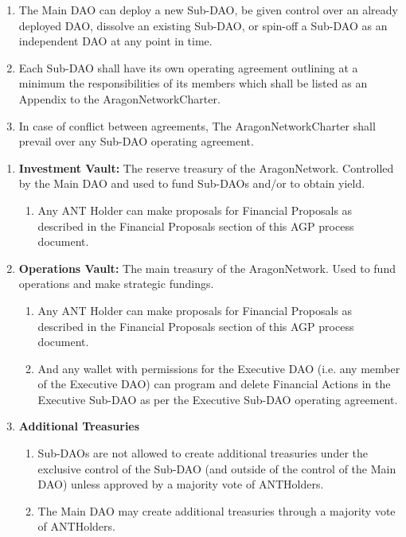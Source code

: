 \begin{enumerate}
	\begin{enumerate}
		\item The Main \ac{DAO} can deploy a new Sub-\ac{DAO}, be given control over an already deployed \ac{DAO}, dissolve an existing Sub-\ac{DAO}, or spin-off a Sub-\ac{DAO} as an independent \ac{DAO} at any point in time.
		\item Each Sub-\ac{DAO} shall have its own operating agreement outlining at a minimum the responsibilities of its members which shall be listed as an Appendix to the \gls{AragonNetworkCharter}.
		\item In case of conflict between agreements, The \gls{AragonNetworkCharter} shall prevail over any Sub-\ac{DAO} operating agreement.
	\end{enumerate}

	\begin{enumerate}
			
		\item \textbf{Investment Vault:} The reserve treasury of the \gls{AragonNetwork}.
		Controlled by the Main \ac{DAO} and used to fund Sub-\acp{DAO} and/or to obtain yield.
		\begin{enumerate}
			\item Any \ac{ANT} Holder can make proposals for Financial Proposals as described in the Financial Proposals section of this \ac{AGP} process document.
		\end{enumerate}
		
		\item \textbf{Operations Vault:} The main treasury of the \gls{AragonNetwork}.
		Used to fund operations and make strategic fundings.
		\begin{enumerate}
			\item Any \ac{ANT} Holder can make proposals for Financial Proposals as
			described in the Financial Proposals section of this \ac{AGP} process
			document.
			\item And any wallet with permissions for the Executive \ac{DAO} (i.e. any member of the Executive \ac{DAO}) can program and delete Financial Actions in the Executive Sub-\ac{DAO} as per the Executive Sub-\ac{DAO} operating agreement.
		\end{enumerate}

		\item \textbf{Additional Treasuries}
		\begin{enumerate}
			\item Sub-\acp{DAO} are not allowed to create additional treasuries under the exclusive control of the Sub-\ac{DAO} (and outside of the control of the Main \ac{DAO}) unless approved by a majority vote of \glspl{ANTHolder}.
			\item The Main \ac{DAO} may create additional treasuries through a majority vote of \glspl{ANTHolder}.
		\end{enumerate}  
	

\end{enumerate}
\end{enumerate}
